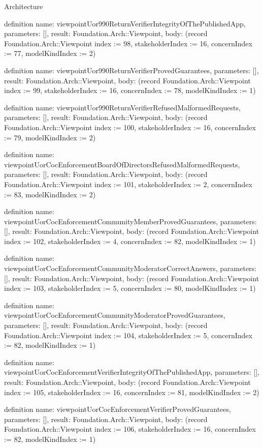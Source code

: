 \begin{lexlean}{Architecture}
\begin{semanticmodule}
definition{
  name: viewpointUor990ReturnVerifierIntegrityOfThePublishedApp,
  parameters: [],
  result: Foundation.Arch::Viewpoint,
  body: (record Foundation.Arch::Viewpoint {index := 98, stakeholderIndex := 16, concernIndex := 77, modelKindIndex := 2})
}

definition{
  name: viewpointUor990ReturnVerifierProvedGuarantees,
  parameters: [],
  result: Foundation.Arch::Viewpoint,
  body: (record Foundation.Arch::Viewpoint {index := 99, stakeholderIndex := 16, concernIndex := 78, modelKindIndex := 1})
}

definition{
  name: viewpointUor990ReturnVerifierRefusedMalformedRequests,
  parameters: [],
  result: Foundation.Arch::Viewpoint,
  body: (record Foundation.Arch::Viewpoint {index := 100, stakeholderIndex := 16, concernIndex := 79, modelKindIndex := 2})
}

definition{
  name: viewpointUorCocEnforcementBoardOfDirectorsRefusedMalformedRequests,
  parameters: [],
  result: Foundation.Arch::Viewpoint,
  body: (record Foundation.Arch::Viewpoint {index := 101, stakeholderIndex := 2, concernIndex := 83, modelKindIndex := 2})
}

definition{
  name: viewpointUorCocEnforcementCommunityMemberProvedGuarantees,
  parameters: [],
  result: Foundation.Arch::Viewpoint,
  body: (record Foundation.Arch::Viewpoint {index := 102, stakeholderIndex := 4, concernIndex := 82, modelKindIndex := 1})
}

definition{
  name: viewpointUorCocEnforcementCommunityModeratorCorrectAnswers,
  parameters: [],
  result: Foundation.Arch::Viewpoint,
  body: (record Foundation.Arch::Viewpoint {index := 103, stakeholderIndex := 5, concernIndex := 80, modelKindIndex := 1})
}

definition{
  name: viewpointUorCocEnforcementCommunityModeratorProvedGuarantees,
  parameters: [],
  result: Foundation.Arch::Viewpoint,
  body: (record Foundation.Arch::Viewpoint {index := 104, stakeholderIndex := 5, concernIndex := 82, modelKindIndex := 1})
}

definition{
  name: viewpointUorCocEnforcementVerifierIntegrityOfThePublishedApp,
  parameters: [],
  result: Foundation.Arch::Viewpoint,
  body: (record Foundation.Arch::Viewpoint {index := 105, stakeholderIndex := 16, concernIndex := 81, modelKindIndex := 2})
}

definition{
  name: viewpointUorCocEnforcementVerifierProvedGuarantees,
  parameters: [],
  result: Foundation.Arch::Viewpoint,
  body: (record Foundation.Arch::Viewpoint {index := 106, stakeholderIndex := 16, concernIndex := 82, modelKindIndex := 1})
}


\end{semanticmodule}
\end{lexlean}
